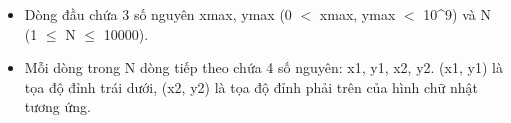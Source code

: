 \begin{itemize}
	\item Dòng đầu chứa 3 số nguyên xmax, ymax (0 $<$ xmax, ymax $<$ 10^9) và N (1  $\le$  N  $\le$  10000).
	\item Mỗi dòng trong N dòng tiếp theo chứa 4 số nguyên: x1, y1, x2, y2. (x1, y1) là tọa độ đỉnh trái dưới, (x2, y2) là tọa độ đỉnh phải trên của hình chữ nhật tương ứng.
\end{itemize}

\